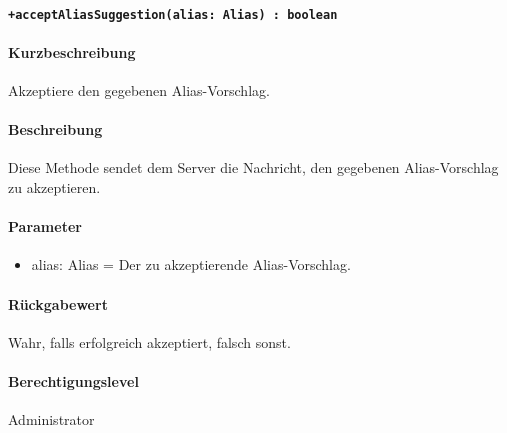 \paragraph{\texttt{+acceptAliasSuggestion(alias: Alias) : boolean}}%
\paragraph*{Kurzbeschreibung}
Akzeptiere den gegebenen Alias-Vorschlag.
\paragraph*{Beschreibung}
Diese Methode sendet dem Server die Nachricht, den gegebenen Alias-Vorschlag zu akzeptieren.
\paragraph*{Parameter}
\begin{itemize}
    \item alias: Alias = Der zu akzeptierende Alias-Vorschlag.
\end{itemize}
\paragraph*{Rückgabewert}
Wahr, falls erfolgreich akzeptiert, falsch sonst.
\paragraph*{Berechtigungslevel}
Administrator